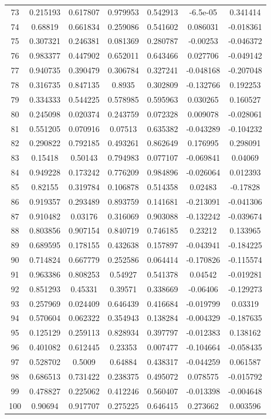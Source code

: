 \begin{table}
\begin{tabular}{c|c|c|c|c|c|c}
73 & 0.215193 & 0.617807 & 0.979953 & 0.542913 & -6.5e-05 & 0.341414\\
74 & 0.68819 & 0.661834 & 0.259086 & 0.541602 & 0.086031 & -0.018361\\
75 & 0.307321 & 0.246381 & 0.081369 & 0.280787 & -0.00253 & -0.046372\\
76 & 0.983377 & 0.447902 & 0.652011 & 0.643466 & 0.027706 & -0.049142\\
77 & 0.940735 & 0.390479 & 0.306784 & 0.327241 & -0.048168 & -0.207048\\
78 & 0.316735 & 0.847135 & 0.8935 & 0.302809 & -0.132766 & 0.192253\\
79 & 0.334333 & 0.544225 & 0.578985 & 0.595963 & 0.030265 & 0.160527\\
80 & 0.245098 & 0.020374 & 0.243759 & 0.072328 & 0.009078 & -0.028061\\
81 & 0.551205 & 0.070916 & 0.07513 & 0.635382 & -0.043289 & -0.104232\\
82 & 0.290822 & 0.792185 & 0.493261 & 0.862649 & 0.176995 & 0.298091\\
83 & 0.15418 & 0.50143 & 0.794983 & 0.077107 & -0.069841 & 0.04069\\
84 & 0.949228 & 0.173242 & 0.776209 & 0.984896 & -0.026064 & 0.012393\\
85 & 0.82155 & 0.319784 & 0.106878 & 0.514358 & 0.02483 & -0.17828\\
86 & 0.919357 & 0.293489 & 0.893759 & 0.141681 & -0.213091 & -0.041306\\
87 & 0.910482 & 0.03176 & 0.316069 & 0.903088 & -0.132242 & -0.039674\\
88 & 0.803856 & 0.907154 & 0.840719 & 0.746185 & 0.23212 & 0.133965\\
89 & 0.689595 & 0.178155 & 0.432638 & 0.157897 & -0.043941 & -0.184225\\
90 & 0.714824 & 0.667779 & 0.252586 & 0.064414 & -0.170826 & -0.115574\\
91 & 0.963386 & 0.808253 & 0.54927 & 0.541378 & 0.04542 & -0.019281\\
92 & 0.851293 & 0.45331 & 0.39571 & 0.338669 & -0.06406 & -0.129273\\
93 & 0.257969 & 0.024409 & 0.646439 & 0.416684 & -0.019799 & 0.03319\\
94 & 0.570604 & 0.062322 & 0.354943 & 0.138284 & -0.004329 & -0.187635\\
95 & 0.125129 & 0.259113 & 0.828934 & 0.397797 & -0.012383 & 0.138162\\
96 & 0.401082 & 0.612445 & 0.23353 & 0.007477 & -0.104664 & -0.058435\\
97 & 0.528702 & 0.5009 & 0.64884 & 0.438317 & -0.044259 & 0.061587\\
98 & 0.686513 & 0.731422 & 0.238375 & 0.495072 & 0.078575 & -0.015792\\
99 & 0.478827 & 0.225062 & 0.412246 & 0.560407 & -0.013398 & -0.004648\\
100 & 0.90694 & 0.917707 & 0.275225 & 0.646415 & 0.273662 & 0.003596\\
\end{tabular}
\end{table}
